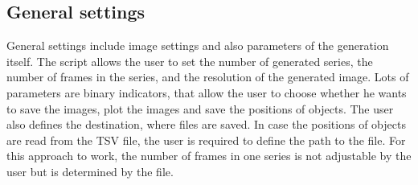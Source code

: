 \subsection{General settings}
General settings include image settings and also parameters of the generation itself. 
The script allows the user to set the number of generated series, the number of frames in the series, and the resolution of the generated image. Lots of parameters are binary indicators, that allow the user to choose whether he wants to save the images, plot the images and save the positions of objects. The user also defines the destination, where files are saved.  In case the positions of objects are read from the TSV file, the user is required to define the path to the file. For this approach to work, the number of frames in one series is not adjustable by the user but is determined by the file. 

